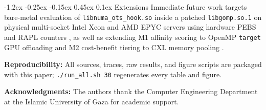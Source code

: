 \documentclass[10pt,twocolumn,letterpaper]{article}
\makeatletter
\renewcommand{\subsection}{\@startsection{subsection}{2}{\z@}%
  {-1.2ex \@plus -0.25ex \@minus -0.15ex}%
  {0.45ex \@plus 0.1ex}%
  {\normalfont\small\itshape}}
\makeatother
\begin{document}
\subsection{Extensions}
Immediate future work targets bare-metal evaluation of \texttt{libnuma\_ots\_hook.so} inside a patched \texttt{libgomp.so.1} on physical multi-socket Intel Xeon and AMD EPYC servers using hardware PEBS and RAPL counters \cite{ref32}, as well as extending M1 affinity scoring to OpenMP \texttt{target} GPU offloading and M2 cost-benefit tiering to CXL memory pooling \cite{ref33}.

\noindent\textbf{Reproducibility:} All sources, traces, raw results, and figure scripts are packaged with this paper; \texttt{./run\_all.sh 30} regenerates every table and figure.

\noindent\textbf{Acknowledgments:} The authors thank the Computer Engineering Department at the Islamic University of Gaza for academic support.
\end{document}
